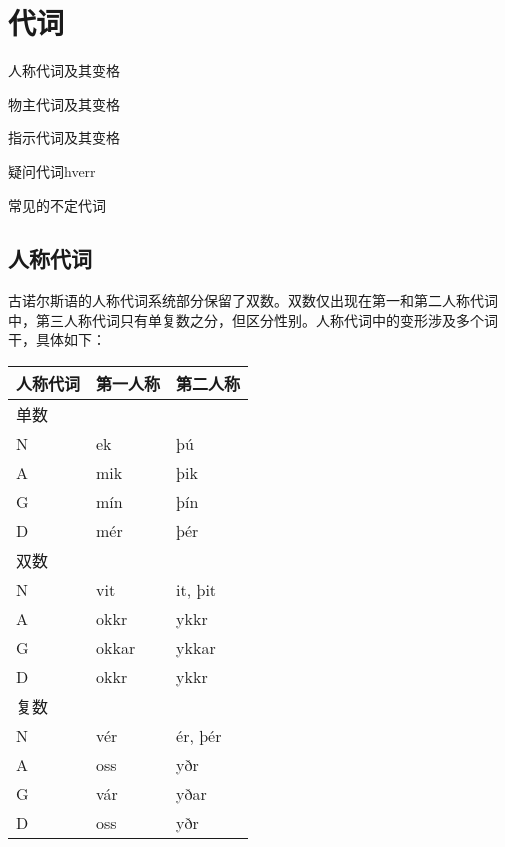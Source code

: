 \chapter{代词}\label{代词}

\begin{introduction}[章节要点]
\item 人称代词及其变格
\item 物主代词及其变格
\item 指示代词及其变格
\item 疑问代词hverr
\item 常见的不定代词
\end{introduction}

\section{人称代词}\label{人称代词}

古诺尔斯语的人称代词系统部分保留了双数。双数仅出现在第一和第二人称代词中，第三人称代词只有单复数之分，但区分性别。人称代词中的变形涉及多个词干，具体如下：

\begin{longtable}{lll}
    \toprule
    人称代词 & 第一人称 & 第二人称 \\
    \midrule
    \endhead
    \bottomrule
    \endfoot
    单数     &          &          \\
    N        & ek       & þú       \\
    A        & mik      & þik      \\
    G        & mín      & þín      \\
    D        & mér      & þér      \\
    双数     &          &          \\
    N        & vit      & it, þit  \\
    A        & okkr     & ykkr     \\
    G        & okkar    & ykkar    \\
    D        & okkr     & ykkr     \\
    复数     &          &          \\
    N        & vér      & ér, þér  \\
    A        & oss      & yðr      \\
    G        & vár      & yðar     \\
    D        & oss      & yðr      \\
\end{longtable}

